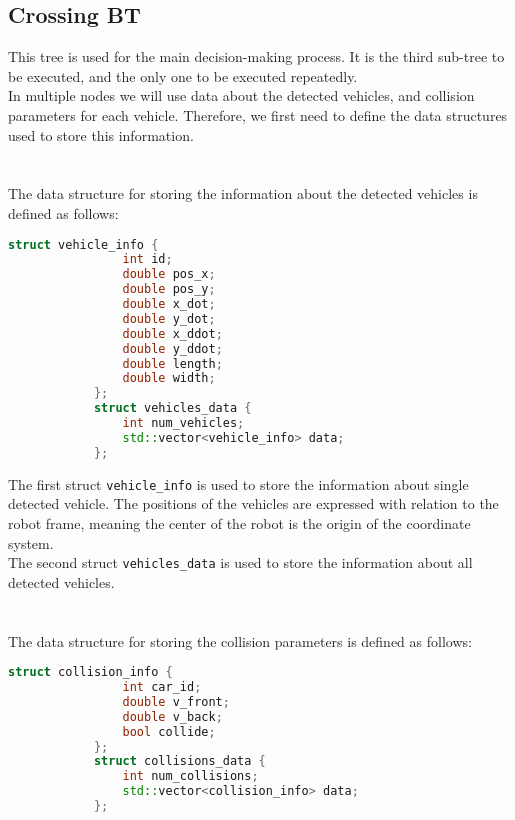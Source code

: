\subsection{Crossing BT}
\label{sec:Crossing-BT-impl}
    This tree is used for the main decision-making process. It is the third sub-tree to be executed, and the only one to be executed repeatedly.\\
    In multiple nodes we will use data about the detected vehicles, and collision parameters for each vehicle. Therefore, we first need to define the data structures used to store this information.\\\\
    \\
        The data structure for storing the information about the detected vehicles is defined as follows:
        \begin{lstlisting}[language=C++, caption={Vehicle data structure}, label={lst:vehicle_data}]
            struct vehicle_info {
                int id;
                double pos_x;
                double pos_y;
                double x_dot;
                double y_dot;
                double x_ddot;
                double y_ddot;
                double length;
                double width;
            };
            struct vehicles_data {
                int num_vehicles;
                std::vector<vehicle_info> data;
            };
        \end{lstlisting}
        The first struct \texttt{vehicle\_info} is used to store the information about single detected vehicle. The positions of the vehicles are expressed with relation to the robot frame, meaning the center of the robot is the origin of the coordinate system.\\
        The second struct \texttt{vehicles\_data} is used to store the information about all detected vehicles.\\\\
    \\
        The data structure for storing the collision parameters is defined as follows:
        \begin{lstlisting}[language=C++, caption={Collision data structure}, label={lst:collision_data}]
            struct collision_info {
                int car_id;
                double v_front;
                double v_back;
                bool collide;
            };
            struct collisions_data {
                int num_collisions;
                std::vector<collision_info> data;
            };
        \end{lstlisting}
